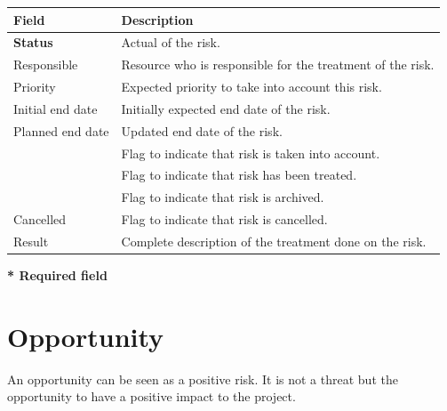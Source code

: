 \documentclass[letterpaper,10pt,english]{sphinxmanual}
\begin{document}
\begin{tabulary}{\linewidth}{|l|l|}
\hline
\textsf{\relax 
Field
} & \textsf{\relax 
Description
}\\
\hline
\textbf{Status}
 & 
Actual {\hyperref[Glossary:term-status]{\emph{}}} of the risk.
\\
\hline
Responsible
 & 
Resource who is responsible for the treatment of the risk.
\\
\hline
Priority
 & 
Expected priority to take into account this risk.
\\
\hline
Initial end date
 & 
Initially expected end date of the risk.
\\
\hline
Planned end date
 & 
Updated end date of the risk.
\\
\hline
{\hyperref[Glossary:term-handled]{\emph{}}}
 & 
Flag to indicate that risk is taken into account.
\\
\hline
{\hyperref[Glossary:term-done]{\emph{}}}
 & 
Flag to indicate that risk has been treated.
\\
\hline
{\hyperref[Glossary:term-closed]{\emph{}}}
 & 
Flag to indicate that risk is archived.
\\
\hline
Cancelled
 & 
Flag to indicate that risk is cancelled.
\\
\hline
Result
 & 
Complete description of the treatment done on the risk.
\\
\hline\end{tabulary}


\textbf{* Required field}
\newpage
{}

\section{Opportunity}
\label{RiskIssueManagement:opportunity}\label{RiskIssueManagement:index-1}
An opportunity can be seen as a positive risk. It is not a threat but the opportunity to have a positive impact to the project.
\end{document}

